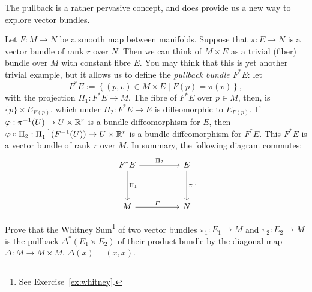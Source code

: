 The pullback is a rather pervasive concept, and does provide us a new way to explore vector bundles.

\begin{example}
	Let $F: M\to N$ be a smooth map between manifolds. Suppose that $\pi: E \to N$ is a vector bundle of rank $r$ over $N$.
	Then we can think of $M\times E$ as a trivial (fiber) bundle over $M$ with constant fibre $E$.
	You may think that this is yet another trivial example, but it allows us to define the \emph{pullback bundle $F^* E$}: let
	\begin{equation}
		F^* E := \left\lbrace (p, v) \in M\times E \mid F(p) = \pi(v)\right\rbrace,
	\end{equation}
	with the projection $\Pi_1: F^* E \to M$.
	The fibre of $F^*E$ over $p\in M$, then, is $\{p\}\times E_{F(p)}$, which under $\Pi_2:F^* E \to E$ is diffeomorphic to $E_{F(p)}$.
	If $\varphi : \pi^{-1}(U) \to U\times\mathbb{R}^r$ is a bundle diffeomorphism for $E$, then $\varphi\circ\Pi_2: \Pi_1^{-1}(F^{-1}(U)) \to U\times\mathbb{R}^r$ is a bundle diffeomorphism for $F^*E$.
	This $F^*E$ is a vector bundle of rank $r$ over $M$.
	In summary, the following diagram commutes:
	\begin{equation}
		\begin{tikzcd}[row sep=huge, column sep=huge]
			F^* E \arrow[r, "\Pi_2"] \arrow[d, "\Pi_1"]
			& E \arrow[d, "\pi"] \\
			M \arrow[r, "F"]
			& N
		\end{tikzcd}.
	\end{equation}
\end{example}

\begin{exercise}
	Prove that the Whitney Sum\footnote{See Exercise~\ref{ex:whitney}.}
	of two vector bundles $\pi_1 : E_1 \to M$ and $\pi_2 : E_2 \to M$
	is the pullback $\Delta^*(E_1 \times E_2)$ of their product bundle by the diagonal map
	$\Delta : M \to M \times M$, $\Delta(x) = (x, x)$.
\end{exercise}

